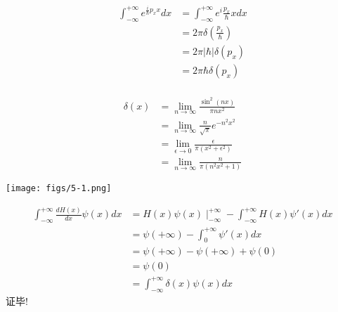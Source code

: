 	{}
	{}
	{\证} ~  \[
		\begin{aligned}
			\int_{-\infty}^{+\infty} e^{\frac{i}{\hbar} p_x x} d x &= \int_{-\infty}^{+\infty} e^i{\frac{p_x}{\hbar} x} d x  \\
			&= 2\pi \delta(\frac{p_x}{\hbar}) \\
			&= 2\pi \left|\hbar\right| \delta(p_x) \\
			&= 2\pi \hbar \delta(p_x) \\
		\end{aligned}
		   \]



	{}
			{}
	\[\begin{aligned}
			\delta(x) &= \lim_{n \to \infty} \frac{\sin^2(nx)}{\pi n x^2 }  \\
			&= \lim_{n \to \infty} \frac{n}{\sqrt{\pi} } e^{-n^2x^2} \\
			&= \lim_{\epsilon \to 0} \frac{\epsilon}{\pi(x^2+\epsilon^2)}  \\
			&= \lim_{n \to \infty} \frac{n}{\pi(n^2x^2+1)}  
	\end{aligned}\]			
	\begin{center}
	   \texttt{[image: figs/5-1.png]}
	\end{center}


	{}
	{}
	{\证 }\[
		\begin{aligned}
		  \int_{-\infty}^{+\infty} \frac{dH(x)}{dx} \psi (x) d x &= H(x) \psi (x)\mid_{-\infty}^{+\infty} - \int_{-\infty}^{+\infty} H(x) \psi' (x) d x \\
		    &=  \psi (+\infty) - \int_{0}^{+\infty} \psi' (x) d x\\
			&=  \psi (+\infty)- \psi (+\infty)+\psi (0)\\
			&=  \psi (0) \\ 
			&=\int_{-\infty}^{+\infty} \delta(x) \psi (x) d x
		\end{aligned}
		   \]
		证毕!



